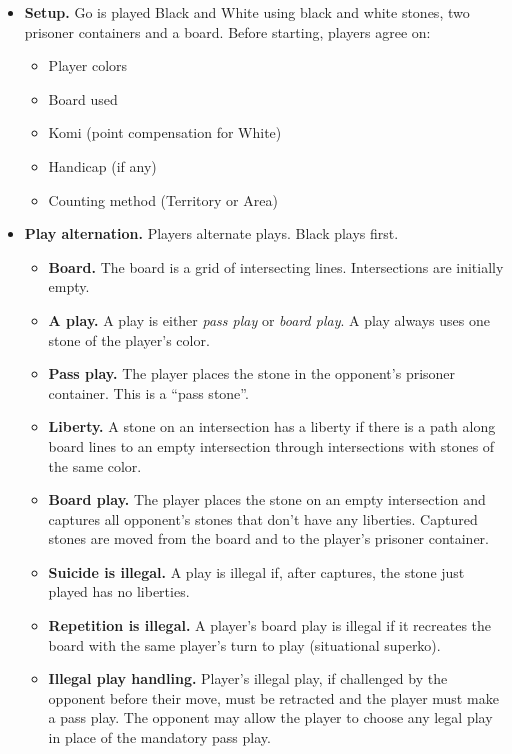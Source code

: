 \documentclass[11pt]{article}
\begin{document}
\begin{itemize}
\item \textbf{Setup.} Go is played Black and White using black and white stones, two prisoner containers and a board.
Before starting, players agree on:
    \begin{itemize}
    \item Player colors
    \item Board used
    \item Komi (point compensation for White)
    \item Handicap (if any)
    \item Counting method (Territory or Area)
    \end{itemize}

\item \textbf{Play alternation.} Players alternate plays.
Black plays first.
    \begin{itemize}
    \item \textbf{Board.} The board is a grid of intersecting lines.
    Intersections are initially empty.
    \item \textbf{A play.} A play is either \textit{pass play} or \textit{board play}.
    A play always uses one stone of the player's color.
    \item \textbf{Pass play.} The player places the stone in the opponent's prisoner container.
    This is a ``pass stone''.
    \item \textbf{Liberty.} A stone on an intersection has a liberty if there is a path along board lines to an empty intersection through intersections with stones of the same color.
    \item \textbf{Board play.} The player places the stone on an empty intersection and captures all opponent's stones that don't have any liberties.
    Captured stones are moved from the board and to the player's prisoner container.
    \item \textbf{Suicide is illegal.} A play is illegal if, after captures, the stone just played has no liberties.
    \item \textbf{Repetition is illegal.} A player's board play is illegal if it recreates the board with the same player's turn to play (situational superko).
    \item \textbf{Illegal play handling.} Player's illegal play, if challenged by the opponent before their move, must be retracted and the player must make a pass play.
    The opponent may allow the player to choose any legal play in place of the mandatory pass play.
    \end{itemize}


\end{itemize}
\end{document}
